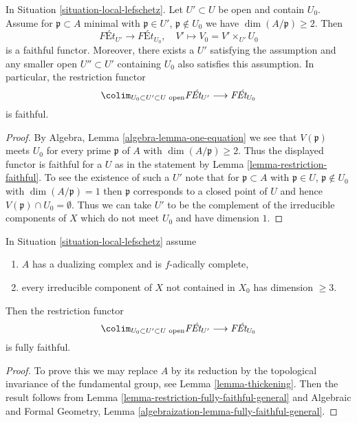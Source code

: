 \begin{lemma}
\label{lemma-faithful-general}
In Situation \ref{situation-local-lefschetz}. Let $U' \subset U$
be open and contain $U_0$. Assume for $\mathfrak p \subset A$ minimal
with $\mathfrak p \in U'$, $\mathfrak p \not \in U_0$ we have
$\dim(A/\mathfrak p) \geq 2$. Then
$$
\textit{F\'Et}_{U'} \longrightarrow \textit{F\'Et}_{U_0},\quad
V' \longmapsto V_0 = V' \times_{U'} U_0
$$
is a faithful functor. Moreover, there exists a $U'$ satisfying
the assumption and any smaller open $U'' \subset U'$ containing
$U_0$ also satisfies this assumption. In particular, the restriction
functor
$$
\colim_{U_0 \subset U' \subset U\text{ open}} \textit{F\'Et}_{U'}
\longrightarrow
\textit{F\'Et}_{U_0}
$$
is faithful.
\end{lemma}

\begin{proof}
By Algebra, Lemma \ref{algebra-lemma-one-equation}
we see that $V(\mathfrak p)$ meets $U_0$ for
every prime $\mathfrak p$ of $A$ with $\dim(A/\mathfrak p) \geq 2$.
Thus the displayed functor is faithful for a $U$ as in the statement
by Lemma \ref{lemma-restriction-faithful}.
To see the existence of such a $U'$ note that for
$\mathfrak p \subset A$ with $\mathfrak p \in U$,
$\mathfrak p \not \in U_0$ with $\dim(A/\mathfrak p) = 1$
then $\mathfrak p$ corresponds to a closed point of $U$
and hence $V(\mathfrak p) \cap U_0 = \emptyset$.
Thus we can take $U'$ to be the complement of the irreducible
components of $X$ which do not meet $U_0$ and have dimension $1$.
\end{proof}

\begin{lemma}
\label{lemma-fully-faithful-general-better}
In Situation \ref{situation-local-lefschetz} assume
\begin{enumerate}
\item $A$ has a dualizing complex and is $f$-adically complete,
\item every irreducible component of $X$ not contained in $X_0$
has dimension $\geq 3$.
\end{enumerate}
Then the restriction functor
$$
\colim_{U_0 \subset U' \subset U\text{ open}} \textit{F\'Et}_{U'}
\longrightarrow
\textit{F\'Et}_{U_0}
$$
is fully faithful.
\end{lemma}

\begin{proof}
To prove this we may replace $A$ by its reduction by the topological
invariance of the fundamental group, see Lemma \ref{lemma-thickening}.
Then the result follows from
Lemma \ref{lemma-restriction-fully-faithful-general}
and Algebraic and Formal Geometry, Lemma
\ref{algebraization-lemma-fully-faithful-general}.
\end{proof}

